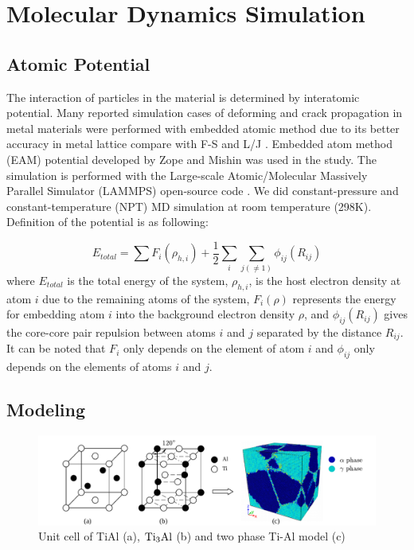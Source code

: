 \documentclass[materials,article,submit,moreauthors,pdftex,10pt,a4paper]{Definitions/mdpi}
\begin{document}
\section{Molecular Dynamics Simulation }\label{section:method}
\subsection{Atomic Potential}

The interaction of particles in the material is determined by interatomic potential. Many reported simulation cases of deforming and crack propagation in metal materials were performed with embedded atomic method due to its better accuracy in metal lattice compare with F-S and L/J \cite{Ko2015,Zepeda-Ruiz2017,Fan2018a}. Embedded atom method (EAM) potential developed by Zope and Mishin \cite{Zope2003} was used in the study. The simulation is performed  with the Large-scale Atomic/Molecular Massively Parallel Simulator (LAMMPS) open-source code \cite{Plimpton1995}. We did constant-pressure and constant-temperature (NPT) MD simulation at room temperature (298K). Definition of the potential is as following:
	
\begin{equation} \label{eq:eam} 
E_{total}= \displaystyle\sum F_i(\rho_{h,i})+\frac{1}{2}\sum_i\sum_{j(\neq1)}\phi_{ij}(R_{ij})
\end{equation}
where $E_{total}$ is the total energy of the system, $\rho_{h,i}$, is the host electron density at atom $i$ due to the remaining atoms of the system, $F_i(\rho)$ represents the energy for embedding atom $i$ into the background electron density $\rho$, and $\phi_{ij}(R_{ij})$ gives the core-core pair repulsion between atoms $i$ and $j$ separated by the distance $R_{ij}$. It can be noted that $F_i$ only depends on the element of atom $i$ and $\phi_{ij}$ only depends on the elements of atoms $i$ and $j$. 

\subsection{Modeling}
\begin{figure}[ht]
	\centering
	\includegraphics[width=1\linewidth]{img/modeling}
	\caption{Unit cell of \rm{TiAl} (a), $\rm{Ti_3Al}$ (b) and two phase Ti-Al model (c)}
	\label{fig:tial-cell}
\end{figure}
\end{document}
